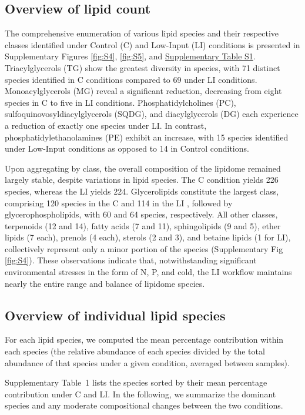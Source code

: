 \documentclass[10pt,letterpaper]{article}
\begin{document}
\subsection*{Overview of lipid count}
The comprehensive enumeration of various lipid species and their respective classes identified under Control (C) and Low-Input (LI) conditions is presented in Supplementary Figures \ref{fig:S4}, \ref{fig:S5}, and \href{https://docs.google.com/spreadsheets/d/1SB90-QLYheKEzmHCUIh1UfgkrtbL064s8Oo5BfwFaV0/edit?gid=0#gid=0}{Supplementary Table S1}. Triacylglycerols (TG) show the greatest diversity in species, with 71 distinct species identified in C conditions compared to 69 under LI conditions. Monoacylglycerols (MG) reveal a significant reduction, decreasing from eight species in C to five in LI conditions. Phosphatidylcholines (PC), sulfoquinovosyldiacylglycerols (SQDG), and diacylglycerols (DG) each experience a reduction of exactly one species under LI. In contrast, phosphatidylethanolamines (PE) exhibit an increase, with 15 species identified under Low-Input conditions as opposed to 14 in Control conditions.

Upon aggregating by class, the overall composition of the lipidome remained largely stable, despite variations in lipid species. The C condition yields 226 species, whereas the LI  yields 224. Glycerolipids constitute the largest class, comprising 120 species in the C and 114 in the LI , followed by glycerophospholipids, with 60 and 64 species, respectively. All other classes, terpenoids (12 and 14), fatty acids (7 and 11), sphingolipids (9 and 5), ether lipids (7 each), prenols (4 each), sterols (2 and 3), and betaine lipids (1 for LI), collectively represent only a minor portion of the species (Supplementary Fig \ref{fig:S4}). These observations indicate that, notwithstanding significant environmental stresses in the form of N, P, and cold, the LI workflow maintains nearly the entire range and balance of lipidome species.


\subsection*{Overview of individual lipid species}
For each lipid species, we computed the mean percentage contribution within each species (the relative abundance of each species divided by the total abundance of that species under a given condition, averaged between samples). 

Supplementary Table~1 lists the species sorted by their mean percentage contribution under C and LI. In the following, we summarize the dominant species and any moderate compositional changes between the two conditions.
\end{document}
